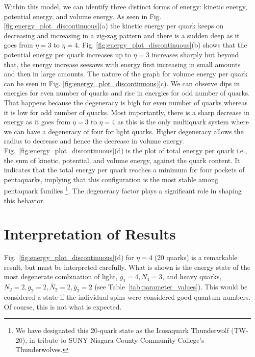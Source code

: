 \documentclass[preprint,12pt]{elsarticle}
\begin{document}
    \begingroup
       \renewcommand{\thefootnote}{\fnsymbol{footnote}}
        Within this model, we can identify three distinct forms of energy: kinetic energy, potential energy, and volume energy. As seen in Fig. \ref{fig:energy_plot_discontinuous}(a) the kinetic energy per quark keeps on decreasing and increasing in a zig-zag pattern and there is a sudden deep as it goes from $\eta=3$ to $\eta=4$. Fig. \ref{fig:energy_plot_discontinuous}(b) shows that the potential energy per quark increases up to $\eta=3$ increases sharply but beyond that, the energy increase seesaws with energy first increasing in small amounts and then in large amounts. The nature of the graph for volume energy per quark can be seen in Fig. \ref{fig:energy_plot_discontinuous}(c). We can observe dips in energies for even number of quarks and rise in energies for odd number of quarks. That happens because the degeneracy is high for even number of quarks whereas it is low for odd number of quarks. Most importantly, there is a sharp decrease in energy as it goes from $\eta=3$ to $\eta=4$ as this is the only multiquark system where we can have a degeneracy of four for light quarks. Higher degeneracy allows the radius to decrease and hence the decrease in volume energy.  
        Fig.~\ref{fig:energy_plot_discontinuous}(d) is the plot of total energy per quark i.e., the sum of kinetic, potential, and volume energy, against the quark content.
        It indicates that the total energy per quark reaches a minimum for four pockets of pentaquarks, implying that this configuration is the most stable among pentaquark families \footnote[1]{We have designated this 20-quark state as the Icosaquark Thunderwolf (TW-20), in tribute to SUNY Niagara County Community College’s Thunderwolves.}. The degeneracy factor plays a significant role in shaping this behavior. 
    \endgroup
            
\section{Interpretation of Results}
    Fig.~\ref{fig:energy_plot_discontinuous}(d) for $\eta=4$ (20 quarks) is a remarkable result, but must be interpreted carefully. What is shown is the energy state of the most degenerate combination of light, $g_1=4, N_1=3$, and heavy quarks, $N_2=2,g_2=2,\bar{N}_2=2,\bar{g}_2=2$ (see Table~\ref{tab:parameter_values}). This would be considered a state if the individual spins were considered good quantum numbers. Of course, this is not what is expected.
    
\end{document}
